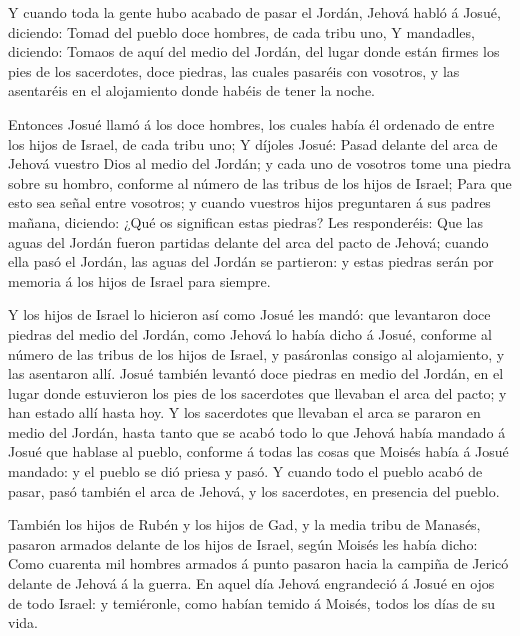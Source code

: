  Y cuando toda la gente hubo acabado de pasar el Jordán,
Jehová habló á Josué, diciendo:  Tomad del pueblo doce
hombres, de cada tribu uno,  Y mandadles, diciendo: Tomaos
de aquí del medio del Jordán, del lugar donde están firmes los pies de
los sacerdotes, doce piedras, las cuales pasaréis con vosotros, y las
asentaréis en el alojamiento donde habéis de tener la noche.

 Entonces Josué llamó á los doce hombres, los cuales había
él ordenado de entre los hijos de Israel, de cada tribu uno;
 Y díjoles Josué: Pasad delante del arca de Jehová vuestro
Dios al medio del Jordán; y cada uno de vosotros tome una piedra sobre
su hombro, conforme al número de las tribus de los hijos de Israel;
 Para que esto sea señal entre vosotros; y cuando vuestros
hijos preguntaren á sus padres mañana, diciendo: ¿Qué os significan
estas piedras?  Les responderéis: Que las aguas del Jordán
fueron partidas delante del arca del pacto de Jehová; cuando ella pasó
el Jordán, las aguas del Jordán se partieron: y estas piedras serán por
memoria á los hijos de Israel para siempre.

 Y los hijos de Israel lo hicieron así como Josué les mandó:
que levantaron doce piedras del medio del Jordán, como Jehová lo había
dicho á Josué, conforme al número de las tribus de los hijos de Israel,
y pasáronlas consigo al alojamiento, y las asentaron allí. 
Josué también levantó doce piedras en medio del Jordán, en el lugar
donde estuvieron los pies de los sacerdotes que llevaban el arca del
pacto; y han estado allí hasta hoy.  Y los sacerdotes que
llevaban el arca se pararon en medio del Jordán, hasta tanto que se
acabó todo lo que Jehová había mandado á Josué que hablase al pueblo,
conforme á todas las cosas que Moisés había á Josué mandado: y el pueblo
se dió priesa y pasó.  Y cuando todo el pueblo acabó de
pasar, pasó también el arca de Jehová, y los sacerdotes, en presencia
del pueblo.

 También los hijos de Rubén y los hijos de Gad, y la media
tribu de Manasés, pasaron armados delante de los hijos de Israel, según
Moisés les había dicho:  Como cuarenta mil hombres armados
á punto pasaron hacia la campiña de Jericó delante de Jehová á la
guerra.  En aquel día Jehová engrandeció á Josué en ojos de
todo Israel: y temiéronle, como habían temido á Moisés, todos los días
de su vida.

